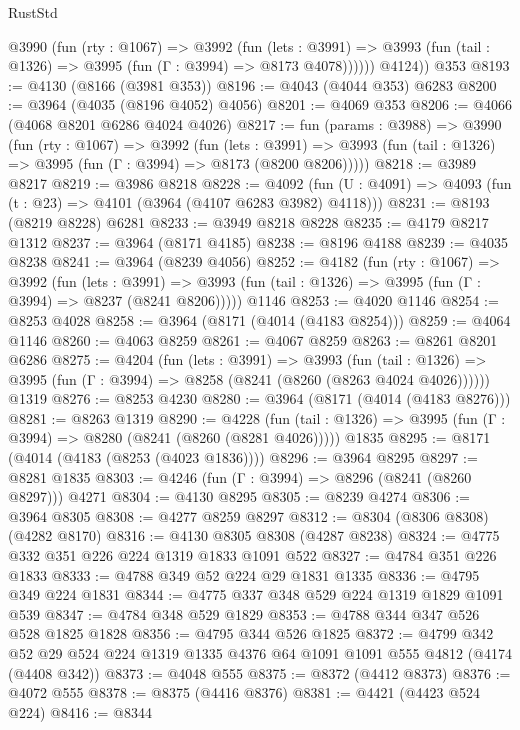 \begin{lexlean}{RustStd}
\begin{coremodule}
{\begin{coremodule}
{{{{{{{{{{{{{{{{{{{{{{{{{{{{{{{{{{{{{{          @3990
            (fun (rty : @1067) =>
            @3992
              (fun (lets : @3991) =>
              @3993 (fun (tail : @1326) => @3995 (fun (Γ : @3994) => @8173 @4078))))))
        @4124))
    @353
@8193 := @4130 (@8166 (@3981 @353))
@8196 := @4043 (@4044 @353) @6283
@8200 := @3964 (@4035 (@8196 @4052) @4056)
@8201 := @4069 @353
@8206 := @4066 (@4068 @8201 @6286 @4024 @4026)
@8217 := fun (params : @3988) =>
  @3990
    (fun (rty : @1067) =>
    @3992
      (fun (lets : @3991) =>
      @3993 (fun (tail : @1326) => @3995 (fun (Γ : @3994) => @8173 (@8200 @8206)))))
@8218 := @3989 @8217
@8219 := @3986 @8218
@8228 := @4092 (fun (U : @4091) => @4093 (fun (t : @23) => @4101 (@3964 (@4107 @6283 @3982) @4118)))
@8231 := @8193 (@8219 @8228) @6281
@8233 := @3949 @8218 @8228
@8235 := @4179 @8217 @1312
@8237 := @3964 (@8171 @4185)
@8238 := @8196 @4188
@8239 := @4035 @8238
@8241 := @3964 (@8239 @4056)
@8252 := @4182
    (fun (rty : @1067) =>
    @3992
      (fun (lets : @3991) =>
      @3993 (fun (tail : @1326) => @3995 (fun (Γ : @3994) => @8237 (@8241 @8206)))))
    @1146
@8253 := @4020 @1146
@8254 := @8253 @4028
@8258 := @3964 (@8171 (@4014 (@4183 @8254)))
@8259 := @4064 @1146
@8260 := @4063 @8259
@8261 := @4067 @8259
@8263 := @8261 @8201 @6286
@8275 := @4204
    (fun (lets : @3991) =>
    @3993
      (fun (tail : @1326) => @3995 (fun (Γ : @3994) => @8258 (@8241 (@8260 (@8263 @4024 @4026))))))
    @1319
@8276 := @8253 @4230
@8280 := @3964 (@8171 (@4014 (@4183 @8276)))
@8281 := @8263 @1319
@8290 := @4228
    (fun (tail : @1326) => @3995 (fun (Γ : @3994) => @8280 (@8241 (@8260 (@8281 @4026)))))
    @1835
@8295 := @8171 (@4014 (@4183 (@8253 (@4023 @1836))))
@8296 := @3964 @8295
@8297 := @8281 @1835
@8303 := @4246 (fun (Γ : @3994) => @8296 (@8241 (@8260 @8297))) @4271
@8304 := @4130 @8295
@8305 := @8239 @4274
@8306 := @3964 @8305
@8308 := @4277 @8259 @8297
@8312 := @8304 (@8306 @8308) (@4282 @8170)
@8316 := @4130 @8305 @8308 (@4287 @8238)
@8324 := @4775 @332 @351 @226 @224 @1319 @1833 @1091 @522
@8327 := @4784 @351 @226 @1833
@8333 := @4788 @349 @52 @224 @29 @1831 @1335
@8336 := @4795 @349 @224 @1831
@8344 := @4775 @337 @348 @529 @224 @1319 @1829 @1091 @539
@8347 := @4784 @348 @529 @1829
@8353 := @4788 @344 @347 @526 @528 @1825 @1828
@8356 := @4795 @344 @526 @1825
@8372 := @4799
    @342
    @52
    @29
    @524
    @224
    @1319
    @1335
    @4376
    @64
    @1091
    @1091
    @555
    @4812
    (@4174 (@4408 @342))
@8373 := @4048 @555
@8375 := @8372 (@4412 @8373)
@8376 := @4072 @555
@8378 := @8375 (@4416 @8376)
@8381 := @4421 (@4423 @524 @224)
@8416 := @8344
}}}}}}}}}}}}}}}}}}}}}}}}}}}}}}}}}}}}}}
\end{coremodule}}
\end{coremodule}
\end{lexlean}
